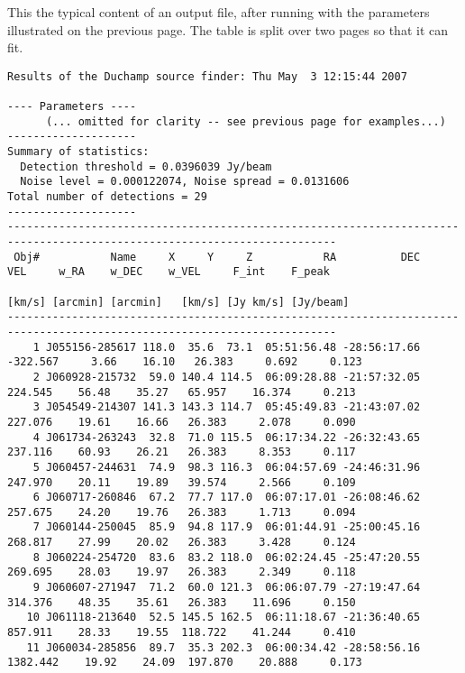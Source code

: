 \begin{landscape}
\label{app-output}
This the typical content of an output file, after running \duchamp
with the parameters illustrated on the previous page. The table is
split over two pages so that it can fit.

{\tiny 
  \begin{verbatim}
Results of the Duchamp source finder: Thu May  3 12:15:44 2007

---- Parameters ----
      (... omitted for clarity -- see previous page for examples...)
--------------------
Summary of statistics:
  Detection threshold = 0.0396039 Jy/beam
  Noise level = 0.000122074, Noise spread = 0.0131606
Total number of detections = 29
--------------------
-------------------------------------------------------------------------------------------------------------------------
 Obj#           Name     X     Y     Z           RA          DEC      VEL     w_RA    w_DEC    w_VEL     F_int    F_peak 
                                                                   [km/s] [arcmin] [arcmin]   [km/s] [Jy km/s] [Jy/beam] 
-------------------------------------------------------------------------------------------------------------------------
    1 J055156-285617 118.0  35.6  73.1  05:51:56.48 -28:56:17.66 -322.567     3.66    16.10   26.383     0.692     0.123 
    2 J060928-215732  59.0 140.4 114.5  06:09:28.88 -21:57:32.05  224.545    56.48    35.27   65.957    16.374     0.213 
    3 J054549-214307 141.3 143.3 114.7  05:45:49.83 -21:43:07.02  227.076    19.61    16.66   26.383     2.078     0.090 
    4 J061734-263243  32.8  71.0 115.5  06:17:34.22 -26:32:43.65  237.116    60.93    26.21   26.383     8.353     0.117 
    5 J060457-244631  74.9  98.3 116.3  06:04:57.69 -24:46:31.96  247.970    20.11    19.89   39.574     2.566     0.109 
    6 J060717-260846  67.2  77.7 117.0  06:07:17.01 -26:08:46.62  257.675    24.20    19.76   26.383     1.713     0.094 
    7 J060144-250045  85.9  94.8 117.9  06:01:44.91 -25:00:45.16  268.817    27.99    20.02   26.383     3.428     0.124 
    8 J060224-254720  83.6  83.2 118.0  06:02:24.45 -25:47:20.55  269.695    28.03    19.97   26.383     2.349     0.118 
    9 J060607-271947  71.2  60.0 121.3  06:06:07.79 -27:19:47.64  314.376    48.35    35.61   26.383    11.696     0.150 
   10 J061118-213640  52.5 145.5 162.5  06:11:18.67 -21:36:40.65  857.911    28.33    19.55  118.722    41.244     0.410 
   11 J060034-285856  89.7  35.3 202.3  06:00:34.42 -28:58:56.16 1382.442    19.92    24.09  197.870    20.888     0.173 

\end{verbatim}}
\end{landscape}
